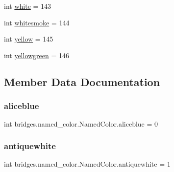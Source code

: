 \begin{DoxyCompactItemize}
\item 
int \mbox{\hyperlink{classbridges_1_1named__color_1_1_named_color_a087174c88b226d37b042562b71b9710d}{white}} = 143
\item 
int \mbox{\hyperlink{classbridges_1_1named__color_1_1_named_color_aa7795320a0fa4698fe4132054fcf4ac3}{whitesmoke}} = 144
\item 
int \mbox{\hyperlink{classbridges_1_1named__color_1_1_named_color_a2437e7564828555a86f2364834703a8d}{yellow}} = 145
\item 
int \mbox{\hyperlink{classbridges_1_1named__color_1_1_named_color_a74aef0729d05ac029a522364fd21dd7a}{yellowgreen}} = 146
\end{DoxyCompactItemize}


\subsection{Member Data Documentation}
\mbox{\label{classbridges_1_1named__color_1_1_named_color_aee5ed43983f4942acabae2cb74b9c6fd}} 
\subsubsection{\texorpdfstring{aliceblue}{aliceblue}}
{\footnotesize\ttfamily int bridges.\+named\+\_\+color.\+Named\+Color.\+aliceblue = 0\hspace{0.3cm}{\ttfamily [static]}}

\mbox{\label{classbridges_1_1named__color_1_1_named_color_a095e0f1c39cca4646342de08f3e2ae08}} 
\subsubsection{\texorpdfstring{antiquewhite}{antiquewhite}}
{\footnotesize\ttfamily int bridges.\+named\+\_\+color.\+Named\+Color.\+antiquewhite = 1\hspace{0.3cm}{\ttfamily [static]}}

\mbox{\label{classbridges_1_1named__color_1_1_named_color_a5b0169dcaba9e476f8e27661a2f8bac2}} 
